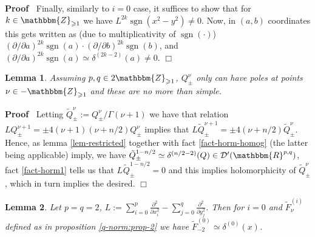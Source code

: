 \documentclass{article}
\newcommand{\assign}{:=}
\newcommand{\tmop}[1]{\ensuremath{\operatorname{#1}}}
\newenvironment{proof}{\noindent\textbf{Proof\ }}{\hspace*{\fill}$\Box$\medskip}
\numberwithin{definition}{section}
\newtheorem{lemma}{Lemma}
\numberwithin{lemma}{section}
\numberwithin{proposition}{section}
{\theorembodyfont{\rmfamily}\newtheorem{remark}{Remark}
\numberwithin{remark}{section}
}
\begin{document}
\begin{proof}
  Finally, similarly to $i = 0$ case, it suffices to show that for $k \in
  \mathbbm{Z}_{\geqslant 1}$ we have $L^{2 k} \tmop{sgn} ( x^2 - y^2) \neq 0$.
  Now, in $( a, b)$ coordinates this gets written as (due to multiplicativity
  of $\tmop{sgn} ( \cdot)$) $( \partial / \partial a)^{2 k} \tmop{sgn} ( a)
  \cdot ( \partial / \partial b)^{2 k} \tmop{sgn} ( b)$, and $( \partial /
  \partial a)^{2 k} \tmop{sgn} ( a) \simeq \delta^{( 2 k - 2)} ( a) \neq 0$.
\end{proof}

\begin{lemma}
  \label{lem-pq2holo}Assuming $p, q \in 2\mathbbm{Z}_{\geqslant 1}$,
  $Q_{\pm}^{\nu}$ only can have poles at points $\nu \in
  -\mathbbm{Z}_{\geqslant 1}$ and these are no more than simple.
\end{lemma}

\begin{proof}
  Letting $\tilde{Q}^{\nu}_{\pm} \assign Q^{\nu}_{\pm} / \Gamma ( \nu + 1)$ we
  have that relation $L Q_{\pm}^{\nu + 1} = \pm 4 ( \nu + 1) ( \nu + n / 2)
  Q_{\pm}^{\nu}$ implies that $L \tilde{Q}_{\pm}^{\nu + 1} = \pm 4 ( \nu + n /
  2) \tilde{Q}_{\pm}^{\nu}$. Hence, as lemma \ref{lem-restricted} together
  with fact \ref{fact-horm-homog} (the latter being applicable) imply, we have
  $\tilde{Q}_{\pm}^{1 - n / 2} \simeq \delta^{( n / 2 - 2)} ( Q) \in
  \mathcal{D}' ( \mathbbm{R}^{p, q})$, fact \ref{fact-horm1} tells us that
  $L^{} \tilde{Q}_{\pm}^{1 - n / 2} = 0$ and this implies holomorphicity of
  $\tilde{Q}_{\pm}^{\nu}$, which in turn implies the desired.
\end{proof}

\begin{lemma}
  \label{lem-r1-e}Let $p = q = 2$, $L \assign \sum_{i = 0}^p
  \frac{\partial^2}{\partial x_i^2} - \sum_{j = 0}^q
  \frac{\partial^2}{\partial y_j^2}$. Then for $i = 0$ and $\tilde{F}_{\nu}^{(
  i)}$ defined as in proposition \ref{q-norm:prop-2} we have $\tilde{F}^{(
  0)}_{- 2} \simeq \delta^{( 0)} ( x)$.
\end{lemma}
\end{document}

